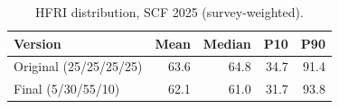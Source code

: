 \begin{table}[htbp]
\centering
\small
\caption{HFRI distribution, SCF 2025 (survey-weighted).}
\label{tab:dist}
\begin{tabular}{lrrrr}
\toprule
Version & Mean & Median & P10 & P90 \\
\midrule
Original (25/25/25/25) & 63.6 & 64.8 & 34.7 & 91.4 \\
Final (5/30/55/10) & 62.1 & 61.0 & 31.7 & 93.8 \\
\bottomrule
\end{tabular}
\end{table}

